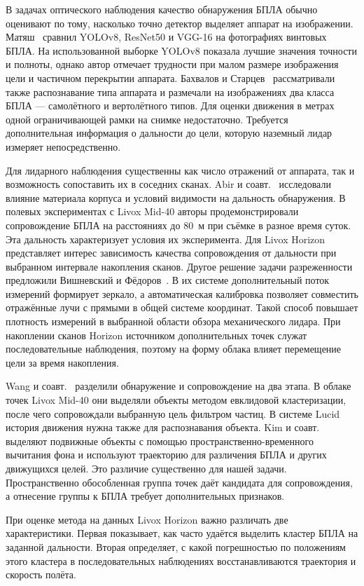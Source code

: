\documentclass{misisarticle}
\begin{document}
В задачах оптического наблюдения качество обнаружения БПЛА обычно оценивают по тому, насколько точно детектор выделяет аппарат на изображении. Матяш~\cite{ref3} сравнил YOLOv8, ResNet50 и VGG-16 на фотографиях винтовых БПЛА. На использованной выборке YOLOv8 показала лучшие значения точности и полноты, однако автор отмечает трудности при малом размере изображения цели и частичном перекрытии аппарата. Бахвалов и Старцев~\cite{ref4} рассматривали также распознавание типа аппарата и размечали на изображениях два класса БПЛА --- самолётного и вертолётного типов. Для оценки движения в метрах одной ограничивающей рамки на снимке недостаточно. Требуется дополнительная информация о дальности до цели, которую наземный лидар измеряет непосредственно.

Для лидарного наблюдения существенны как число отражений от аппарата, так и возможность сопоставить их в соседних сканах. Abir и соавт.~\cite{ref2} исследовали влияние материала корпуса и условий видимости на дальность обнаружения. В полевых экспериментах с Livox Mid-40 авторы продемонстрировали сопровождение БПЛА на расстояниях до 80~м при съёмке в разное время суток. Эта дальность характеризует условия их эксперимента. Для Livox Horizon представляет интерес зависимость качества сопровождения от дальности при выбранном интервале накопления сканов. Другое решение задачи разреженности предложили Вишневский и Фёдоров~\cite{ref5}. В их системе дополнительный поток измерений формирует зеркало, а автоматическая калибровка позволяет совместить отражённые лучи с прямыми в общей системе координат. Такой способ повышает плотность измерений в выбранной области обзора механического лидара. При накоплении сканов Horizon источником дополнительных точек служат последовательные наблюдения, поэтому на форму облака влияет перемещение цели за время накопления.

Wang и соавт.~\cite{ref6} разделили обнаружение и сопровождение на два этапа. В облаке точек Livox Mid-40 они выделяли объекты методом евклидовой кластеризации, после чего сопровождали выбранную цель фильтром частиц. В системе Lucid история движения нужна также для распознавания объекта. Kim и соавт.~\cite{ref1} выделяют подвижные объекты с помощью пространственно-временного вычитания фона и используют траекторию для различения БПЛА и других движущихся целей. Это различие существенно для нашей задачи. Пространственно обособленная группа точек даёт кандидата для сопровождения, а отнесение группы к БПЛА требует дополнительных признаков.

При оценке метода на данных Livox Horizon важно различать две характеристики. Первая показывает, как часто удаётся выделить кластер БПЛА на заданной дальности. Вторая определяет, с какой погрешностью по положениям этого кластера в последовательных наблюдениях восстанавливаются траектория и скорость полёта.
\end{document}
